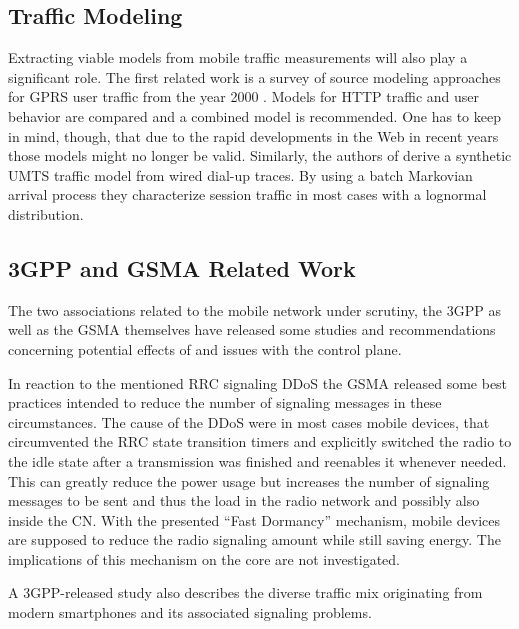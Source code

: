 \subsection{Traffic Modeling}

Extracting viable models from mobile traffic measurements will also play a significant role. The first related work is a survey of source modeling approaches for \gls{GPRS} user traffic from the year 2000 \cite{staehle2000source}. Models for \gls{HTTP} traffic and user behavior are compared and a combined model is recommended. One has to keep in mind, though, that due to the rapid developments in the Web in recent years those models might no longer be valid. Similarly, the authors of \cite{965876} derive a synthetic \gls{UMTS} traffic model from wired dial-up traces. By using a batch Markovian arrival process they characterize session traffic in most cases with a lognormal distribution.


\subsection{\texorpdfstring{\acrshort{3GPP}}{3GPP} and \texorpdfstring{\acrshort{GSMA}}{GSMA} Related Work}

The two associations related to the mobile network under scrutiny, the \gls{3GPP} as well as the \gls{GSMA} themselves have released some studies and recommendations concerning potential effects of and issues with the control plane. 

In reaction to the mentioned \gls{RRC} signaling \gls{DDoS} the \gls{GSMA} released some best practices \cite{gsma2011fdbestpract} intended to reduce the number of signaling messages in these circumstances. The cause of the \gls{DDoS} were in most cases mobile devices, that circumvented the \gls{RRC} state transition timers and explicitly switched the radio to the idle state after a transmission was finished and reenables it whenever needed. This can greatly reduce the power usage but increases the number of signaling messages to be sent and thus the load in the radio network and possibly also inside the \gls{CN}. With the presented ``Fast Dormancy'' mechanism, mobile devices are supposed to reduce the radio signaling amount while still saving energy. The implications of this mechanism on the core are not investigated.

A \gls{3GPP}-released study \cite{3gpp.22.801} also describes the diverse traffic mix originating from modern smartphones and its associated signaling problems.

